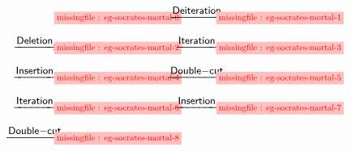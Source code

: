 \newcommand{\negsp}{\!\!\!\!\!\!\!\!\!\!\!\!\!\!\!}
\newcommand{\sxstep}[1]{\negsp\xstep{#1}\negsp}
\newcommand{\tkfig}{\tikzfig{0.75}{0.5}}
$$
\begin{array}{cccc@{\vspace{1em}}}
&\tkfig{eg-socrates-mortal-0}
&\sxstep{\rsf{Deiteration}}
&\tkfig{eg-socrates-mortal-1}
\\
\sxstep{\rsf{Deletion}}
&\tkfig{eg-socrates-mortal-2}
&\sxstep{\rsf{Iteration}}
&\tkfig{eg-socrates-mortal-3}
\\
\sxstep{\rsf{Insertion}}
&\tkfig{eg-socrates-mortal-4}
&\sxstep{\rsf{Double{-}cut}}
&\tkfig{eg-socrates-mortal-5}
\\
\sxstep{\rsf{Iteration}}
&\tkfig{eg-socrates-mortal-6}
&\sxstep{\rsf{Insertion}}
&\tkfig{eg-socrates-mortal-7}
\\
\sxstep{\rsf{Double{-}cut}}
&\tkfig{eg-socrates-mortal-8}
&
&
\end{array}
\negsp
\negsp
\negsp
$$
